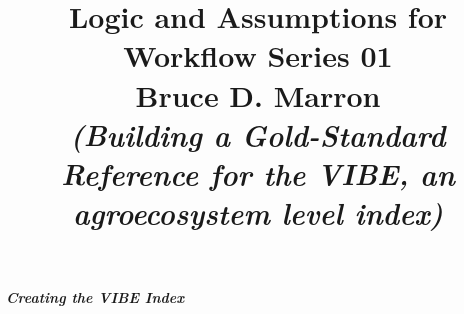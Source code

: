 \documentclass[12pt, letterpaper]{article}
\title{\vspace{-5mm}\fontsize{14pt}{12pt}
                    \selectfont \textbf{Logic and Assumptions for Workflow Series 01}\\  %
                   \vspace{2mm}
                   Bruce D. Marron \\
                   \vspace{2mm}
                   \textit{(Building a Gold-Standard Reference for the VIBE, an agroecosystem level index)}
      }
\author{
     \vspace{-20mm}
}
\date{}
\begin{document}
\begin{singlespacing}
\maketitle                                      %
\end{singlespacing}
\thispagestyle{fancy}                            %



\large
\begin{flushleft}
\textbf{\textit{Creating the VIBE Index}}
\end{flushleft}
\normalsize
\end{document}
